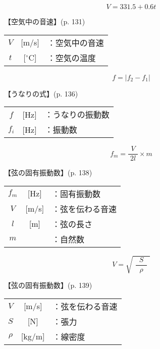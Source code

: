 \documentclass[10pt]{jarticle}
\begin{document}
\[
V = 331.5 + 0.6t
\]


\vskip3mm
【空気中の音速】{\footnotesize (p. 131)}

\begin{tabular}{ccl}
$V$	&[m/s]	&：空気中の音速\\
$t$	&[$^\circ$C]	&：空気の温度\\
\end{tabular}

\newpage





\[
f = |f_2 - f_1|
\]


\vskip3mm
【うなりの式】{\footnotesize (p. 136)}

\begin{tabular}{ccl}
$f$	&[Hz]	&：うなりの振動数\\
$f_i$	&[Hz]	&：振動数\\
\end{tabular}

\newpage




\[
f_m = \frac{V}{\; 2l \;}\times m
\]


\vskip3mm
【弦の固有振動数】{\footnotesize (p. 138)}

\begin{tabular}{ccl}
$f_m$	&[Hz]	&：固有振動数\\
$V$	&[m/s]	&：弦を伝わる音速\\
$l$	&[m]	&：弦の長さ\\
$m$	&	&：自然数\\
\end{tabular}

\newpage




\[
V = \sqrt{\,\, \frac{S}{\;\; \rho \;\;}\,\,}
\]


\vskip3mm
【弦の固有振動数】{\footnotesize (p. 139)}

\begin{tabular}{ccl}
$V$	&[m/s]	&：弦を伝わる音速\\
$S$	&[N]	&：張力\\
$\rho$	&[kg/m]	&：線密度\\
\end{tabular}

\newpage
\end{document}
